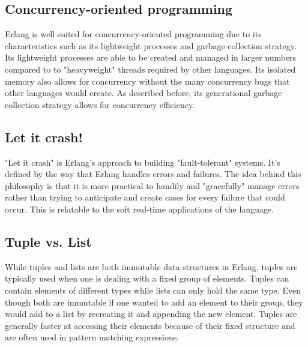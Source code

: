 \documentclass[letterpaper, 10pt]{article}
\begin{document}
\pagebreak

\subsection{Concurrency-oriented programming}

Erlang is well suited for concurrency-oriented programming due to its characteristics such as its lightweight processes and garbage collection strategy. Its lightweight processes are able to be created and managed in larger numbers compared to to "heavyweight" threads required by other languages. Its isolated memory also allows for concurrency without the many concurrency bugs that other languages would create. As described before, its generational garbage collection strategy allows for concurrency efficiency.

\vspace{2em}

\subsection{Let it crash!}

"Let it crash" is Erlang's approach to building "fault-tolerant" systems. It's defined by the way that Erlang handles errors and failures. The idea behind this philosophy is that it is more practical to handily and "gracefully" manage errors rather than trying to anticipate and create cases for every failure that could occur. This is relatable to the soft real-time applications of the language.

\vspace{2em}

\subsection{Tuple vs. List}

While tuples and lists are both immutable data structures in Erlang, tuples are typically used when one is dealing with a fixed group of elements. Tuples can contain elements of different types while lists can only hold the same type. Even though both are immutable if one wanted to add an element to their group, they would add to a list by recreating it and appending the new element. Tuples are generally faster at accessing their elements because of their fixed structure and are often used in pattern matching expressions.

\vspace{2em}
\end{document}
